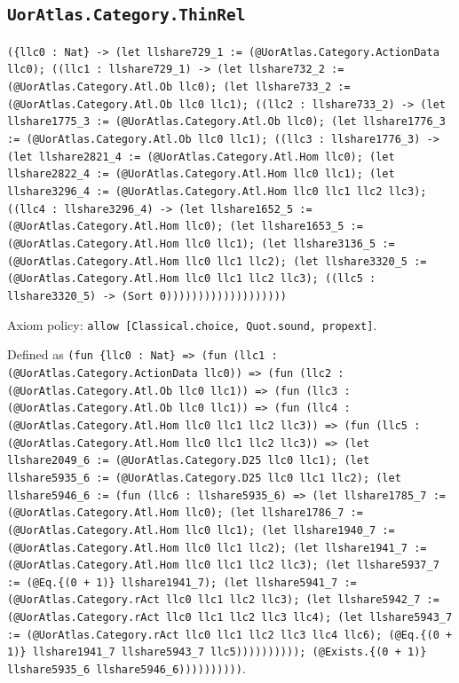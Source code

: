 \documentclass[11pt]{article}
\begin{document}
\subsection*{\texttt{UorAtlas.Category.ThinRel}}
\noindent\texttt{(\{llc0 : Nat\} -> (let llshare729\_1 := (@UorAtlas.Category.ActionData llc0); ((llc1 : llshare729\_1) -> (let llshare732\_2 := (@UorAtlas.Category.Atl.Ob llc0); (let llshare733\_2 := (@UorAtlas.Category.Atl.Ob llc0 llc1); ((llc2 : llshare733\_2) -> (let llshare1775\_3 := (@UorAtlas.Category.Atl.Ob llc0); (let llshare1776\_3 := (@UorAtlas.Category.Atl.Ob llc0 llc1); ((llc3 : llshare1776\_3) -> (let llshare2821\_4 := (@UorAtlas.Category.Atl.Hom llc0); (let llshare2822\_4 := (@UorAtlas.Category.Atl.Hom llc0 llc1); (let llshare3296\_4 := (@UorAtlas.Category.Atl.Hom llc0 llc1 llc2 llc3); ((llc4 : llshare3296\_4) -> (let llshare1652\_5 := (@UorAtlas.Category.Atl.Hom llc0); (let llshare1653\_5 := (@UorAtlas.Category.Atl.Hom llc0 llc1); (let llshare3136\_5 := (@UorAtlas.Category.Atl.Hom llc0 llc1 llc2); (let llshare3320\_5 := (@UorAtlas.Category.Atl.Hom llc0 llc1 llc2 llc3); ((llc5 : llshare3320\_5) -> (Sort 0)))))))))))))))))))}\par
\noindent Axiom policy: \texttt{allow [Classical.choice, Quot.sound, propext]}.\par
\noindent Defined as \texttt{(fun \{llc0 : Nat\} => (fun (llc1 : (@UorAtlas.Category.ActionData llc0)) => (fun (llc2 : (@UorAtlas.Category.Atl.Ob llc0 llc1)) => (fun (llc3 : (@UorAtlas.Category.Atl.Ob llc0 llc1)) => (fun (llc4 : (@UorAtlas.Category.Atl.Hom llc0 llc1 llc2 llc3)) => (fun (llc5 : (@UorAtlas.Category.Atl.Hom llc0 llc1 llc2 llc3)) => (let llshare2049\_6 := (@UorAtlas.Category.D25 llc0 llc1); (let llshare5935\_6 := (@UorAtlas.Category.D25 llc0 llc1 llc2); (let llshare5946\_6 := (fun (llc6 : llshare5935\_6) => (let llshare1785\_7 := (@UorAtlas.Category.Atl.Hom llc0); (let llshare1786\_7 := (@UorAtlas.Category.Atl.Hom llc0 llc1); (let llshare1940\_7 := (@UorAtlas.Category.Atl.Hom llc0 llc1 llc2); (let llshare1941\_7 := (@UorAtlas.Category.Atl.Hom llc0 llc1 llc2 llc3); (let llshare5937\_7 := (@Eq.\{(0 + 1)\} llshare1941\_7); (let llshare5941\_7 := (@UorAtlas.Category.rAct llc0 llc1 llc2 llc3); (let llshare5942\_7 := (@UorAtlas.Category.rAct llc0 llc1 llc2 llc3 llc4); (let llshare5943\_7 := (@UorAtlas.Category.rAct llc0 llc1 llc2 llc3 llc4 llc6); (@Eq.\{(0 + 1)\} llshare1941\_7 llshare5943\_7 llc5)))))))))); (@Exists.\{(0 + 1)\} llshare5935\_6 llshare5946\_6))))))))))}.\par
\end{document}
